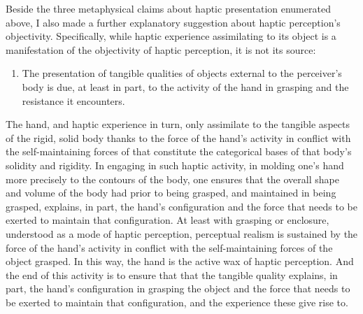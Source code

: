 Beside the three metaphysical claims about haptic presentation enumerated above, I also made a further explanatory suggestion about haptic perception's objectivity. Specifically, while haptic experience assimilating to its object is a manifestation of the objectivity of haptic perception, it is not its source: 
\begin{enumerate}[(4)]
	\item The presentation of tangible qualities of objects external to the perceiver’s body is due, at least in part, to the activity of the hand in grasping and the resistance it encounters.
\end{enumerate}
The hand, and haptic experience in turn, only assimilate to the tangible aspects of the rigid, solid body thanks to the force of the hand’s activity in conflict with the self-maintaining forces of that constitute the categorical bases of that body’s solidity and rigidity. In engaging in such haptic activity, in molding one’s hand more precisely to the contours of the body, one ensures that the overall shape and volume of the body had prior to being grasped, and maintained in being grasped, explains, in part, the hand’s configuration and the force that needs to be exerted to maintain that configuration. At least with grasping or enclosure, understood as a mode of haptic perception, perceptual realism is sustained by the force of the hand’s activity in conflict with the self-maintaining forces of the object grasped. In this way, the hand is the active wax of haptic perception. And the end of this activity is to ensure that that the tangible quality explains, in part, the hand’s configuration in grasping the object and the force that needs to be exerted to maintain that configuration, and the experience these give rise to.

